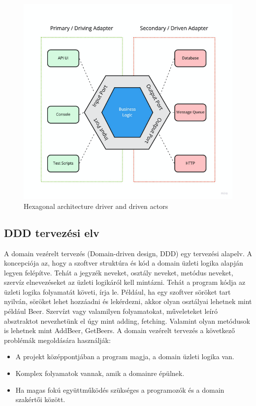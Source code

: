 \begin{figure}[h]
    \centering
    \includegraphics[scale=0.3]{images/ports-adapters}
    \caption{Hexagonal architecture driver and driven actors}
    \label{fig:hexagonal-ports-adapters}
\end{figure}

\subsection{DDD tervezési elv}
A domain vezérelt tervezés (Domain-driven design, DDD) \cite{wiki:Domain-driven_design} egy tervezési alapelv.
A koncepciója az, hogy a szoftver struktúra és kód a domain üzleti logika alapján legyen felépítve.
Tehát a jegyzék neveket, osztály neveket, metódus neveket, szervíz elnevezéseket az üzleti logikáról kell mintázni.
Tehát a program kódja az üzleti logika folyamatát követi, írja le.
Például, ha egy szoftver söröket tart nyilván, söröket lehet hozzáadni és lekérdezni, akkor olyan osztályai lehetnek mint például Beer.
Szervízt vagy valamilyen folyamatokat, műveleteket leíró absztraktot nevezhetünk el úgy mint adding, fetching.
Valamint olyan metódusok is lehetnek mint AddBeer, GetBeers.
A domain vezérelt tervezés a következő problémák megoldására használják:

\begin{itemize}
    \item A projekt középpontjában a program magja, a domain üzleti logika van.
    \item Komplex folyamatok vannak, amik a domainre épülnek.
    \item Ha magas fokú együttműködés szükséges a programozók és a domain szakértői között.
\end{itemize}

